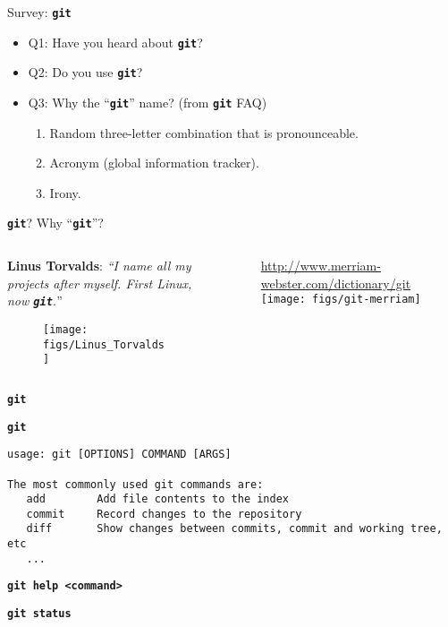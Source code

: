 \documentclass{beamer}
\newcommand{\git}{\texttt{\textbf{git}}\xspace}
\begin{document}
\begin{frame}{Survey: \git}
  \begin{itemize}\setlength{\itemsep}{+3mm}
  \item Q1: Have you heard about \git?
  \item Q2: Do you use \git?
  \item Q3: Why the ``\git'' name? (from \git FAQ)
    \begin{enumerate}\setlength{\itemsep}{+2mm}
    \item Random three-letter combination that is pronounceable.
    \item Acronym (global information tracker).
    \item Irony.
    \end{enumerate}
  \end{itemize}
\end{frame}

\begin{frame}{\git? Why ``\git''?}
  \begin{columns}
    \begin{column}{5cm}
      \textbf{Linus Torvalds}: 
        \emph{``I name all my projects after myself. First Linux, now
        \git.}''
      \begin{figure}
        \centering
        \texttt{[image: figs/Linus\_Torvalds]}
      \end{figure}
    \end{column}
    \begin{column}{7cm}
      \begin{figure}
        \url{http://www.merriam-webster.com/dictionary/git}
        \centering
        \texttt{[image: figs/git-merriam]}
      \end{figure}
    \end{column}
    \end{columns}
\end{frame}


\begin{frame}[containsverbatim]{\git}
  \begin{center}
  \item \texttt{\textbf{git}}
  \end{center}
\begin{verbatim}
usage: git [OPTIONS] COMMAND [ARGS]

The most commonly used git commands are:
   add        Add file contents to the index
   commit     Record changes to the repository
   diff       Show changes between commits, commit and working tree, etc
   ...
\end{verbatim}
  \begin{center}
    \texttt{\textbf{git help <command>}}
  \end{center}
  \begin{center}
    \texttt{\textbf{git status}}
  \end{center}
\end{frame}
\end{document}
